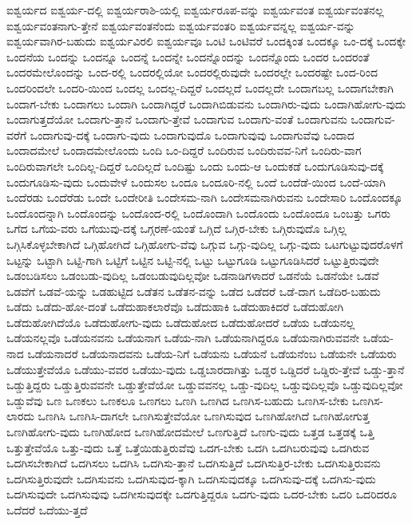 {ಐಶ್ವರ್ಯದ
ಐಶ್ವರ್ಯ-ದಲ್ಲಿ
ಐಶ್ವರ್ಯರಾಶಿ-ಯಲ್ಲಿ
ಐಶ್ವರ್ಯರೂಪ-ವನ್ನು
ಐಶ್ವರ್ಯವಂತ
ಐಶ್ವರ್ಯವಂತನಲ್ಲ
ಐಶ್ವರ್ಯವಂತನಾಗು-ತ್ತೇನೆ
ಐಶ್ವರ್ಯವಂತನೆಂದು
ಐಶ್ವರ್ಯವಂತರಿ
ಐಶ್ವರ್ಯವನ್ನಲ್ಲ
ಐಶ್ವರ್ಯ-ವನ್ನು
ಐಶ್ವರ್ಯವಾಗಿರ-ಬಹುದು
ಐಶ್ವರ್ಯವಿರಲಿ
ಐಶ್ವರ್ಯವೂ
ಒಂಟಿ
ಒಂಟಿವರೆ
ಒಂದಕ್ಕಿಂತ
ಒಂದಕ್ಕೂ
ಒಂ-ದಕ್ಕೆ
ಒಂದಕ್ಕೇ
ಒಂದನೆಯ
ಒಂದನ್ನು
ಒಂದನ್ನೂ
ಒಂದನ್ನೆ
ಒಂದನ್ನೇ
ಒಂದನ್ನೊಂದನ್ನು
ಒಂದನ್ನೊಂದು
ಒಂದರ
ಒಂದರಂತೆ
ಒಂದರಮೇಲೊಂದನ್ನು
ಒಂದ-ರಲ್ಲಿ
ಒಂದರಲ್ಲಿಯೋ
ಒಂದರಲ್ಲಿರುವುದೇ
ಒಂದರಲ್ಲೇ
ಒಂದರಷ್ಟೇ
ಒಂದ-ರಿಂದ
ಒಂದರಿಂದಲೇ
ಒಂದರಿ-ಯಿಂದ
ಒಂದಲ್ಲ
ಒಂದಲ್ಲ-ದಿದ್ದರೆ
ಒಂದಲ್ಲದೆ
ಒಂದಲ್ಲದೇ
ಒಂದಾಗಬಲ್ಲ
ಒಂದಾಗಬೇಕಾಗಿ
ಒಂದಾಗ-ಬೇಕು
ಒಂದಾಗಲು
ಒಂದಾಗಿ
ಒಂದಾಗಿದ್ದರೆ
ಒಂದಾಗಿಬಿಡುವನು
ಒಂದಾಗಿರು-ವುದು
ಒಂದಾಗಿಹೋಗು-ವುದು
ಒಂದಾಗುತ್ತದೆಯೋ
ಒಂದಾಗು-ತ್ತಾನೆ
ಒಂದಾಗು-ತ್ತೇವೆ
ಒಂದಾಗುವ
ಒಂದಾಗು-ವಂತೆ
ಒಂದಾಗುವನು
ಒಂದಾಗುವ-ವರೆಗೆ
ಒಂದಾಗುವು-ದಕ್ಕೆ
ಒಂದಾಗು-ವುದು
ಒಂದಾಗುವುದೊ
ಒಂದಾಗುವುವು
ಒಂದಾಗುವೆವು
ಒಂದಾದ
ಒಂದಾದಮೇಲೆ
ಒಂದಾದಮೇಲೊಂದು
ಒಂದಿ
ಒಂ-ದಿದ್ದರೆ
ಒಂದಿರುವ
ಒಂದಿರುವವ-ನಿಗೆ
ಒಂದಿರು-ವಾಗ
ಒಂದಿರುವಾಗಲೇ
ಒಂದಿಲ್ಲ-ದಿದ್ದರೆ
ಒಂದಿಲ್ಲದೆ
ಒಂದಿಷ್ಟು
ಒಂದು
ಒಂದು-ಆ
ಒಂದುಕಡೆ
ಒಂದುಗೂಡಿಸುವು-ದಕ್ಕೆ
ಒಂದುಗೂಡಿಸು-ವುದು
ಒಂದುವೇಳೆ
ಒಂದುಸಲ
ಒಂದೂ
ಒಂದೂರಿ-ನಲ್ಲಿ
ಒಂದೆ
ಒಂದೆಡೆ-ಯಿಂದ
ಒಂದೆ-ಯಾಗಿ
ಒಂದೆರಡು
ಒಂದೆರೆಡು
ಒಂದೇ
ಒಂದೇರೀತಿ
ಒಂದೇಸಮ-ನಾಗಿ
ಒಂದೇಸಮನಾಗಿರುವನು
ಒಂದೇಸಾರಿ
ಒಂದೊಂದಕ್ಕೂ
ಒಂದೊಂದನ್ನಾಗಿ
ಒಂದೊಂದನ್ನು
ಒಂದೊಂದ-ರಲ್ಲಿ
ಒಂದೊಂದಾಗಿ
ಒಂದೊಂದು
ಒಂದೊಂದೂ
ಒಂಬತ್ತು
ಒಗರು
ಒಗೆದ
ಒಗೆಯ-ವರು
ಒಗೆಯುವು-ದಕ್ಕೆ
ಒಗ್ಗರಣೆ-ಯಂತೆ
ಒಗ್ಗಿದೆ
ಒಗ್ಗಿರ-ಬೇಕು
ಒಗ್ಗಿರುವುದೊ
ಒಗ್ಗಿಲ್ಲ
ಒಗ್ಗಿಸಿಕೊಳ್ಳಬೇಕಾಗಿದೆ
ಒಗ್ಗಿಹೋಗಿದೆ
ಒಗ್ಗಿಹೋಗು-ವೆವು
ಒಗ್ಗುವ
ಒಗ್ಗು-ವುದಿಲ್ಲ
ಒಗ್ಗು-ವುದು
ಒಟಗುಟ್ಟುವುದರೊಳಗೆ
ಒಟ್ಟನ್ನು
ಒಟ್ಟಾಗಿ
ಒಟ್ಟಿ-ಗಾಗಿ
ಒಟ್ಟಿಗೆ
ಒಟ್ಟಿನ
ಒಟ್ಟಿ-ನಲ್ಲಿ
ಒಟ್ಟು
ಒಟ್ಟುಗೂಡಿ
ಒಟ್ಟುಗೂಡಿಸಿದರೆ
ಒಟ್ಟುತ್ತಿರುವುದೇ
ಒಡಂಬಡಿಸಲು
ಒಡಂಬಡು-ವುದಿಲ್ಲ
ಒಡಂಬಡುವುದಿಲ್ಲವೋ
ಒಡನಾಡಿಗಳಾದರೆ
ಒಡನೆಯೆ
ಒಡನೆಯೇ
ಒಡವೆ
ಒಡವೆಗೆ
ಒಡವೆ-ಯನ್ನು
ಒಡಹುಟ್ಟಿದ
ಒಡೆತನ
ಒಡೆತನ-ವನ್ನು
ಒಡೆದ
ಒಡೆದರೆ
ಒಡೆ-ದಾಗ
ಒಡೆದಿರ-ಬಹುದು
ಒಡೆದು
ಒಡೆದು-ಹೋ-ದಂತೆ
ಒಡೆದುಹಾಕಲಾರೆವೊ
ಒಡೆದುಹಾಕಿ
ಒಡೆದುಹಾಕಿದರೆ
ಒಡೆದುಹೋಗಿ
ಒಡೆದುಹೋಗಿದೆಯೊ
ಒಡೆದುಹೋಗು-ವುದು
ಒಡೆದುಹೋದ
ಒಡೆದುಹೋದರೆ
ಒಡೆಯ
ಒಡೆಯನಲ್ಲ
ಒಡೆಯನಲ್ಲವೊ
ಒಡೆಯನವನು
ಒಡೆಯನಾಗ
ಒಡೆಯ-ನಾಗಿ
ಒಡೆಯನಾಗಿದ್ದರೂ
ಒಡೆಯನಾಗಿರುವವನೇ
ಒಡೆಯ-ನಾದ
ಒಡೆಯನಾದರೆ
ಒಡೆಯನಾದವನು
ಒಡೆಯ-ನಿಗೆ
ಒಡೆಯನು
ಒಡೆಯನೆ
ಒಡೆಯನೆಂಬ
ಒಡೆಯನೇ
ಒಡೆಯರು
ಒಡೆಯುತ್ತೇವೆಯೊ
ಒಡೆಯು-ವವರ
ಒಡೆಯು-ವುದು
ಒಡ್ಡಬಾರದಾಗಿತ್ತು
ಒಡ್ಡರ
ಒಡ್ಡಿದರೆ
ಒಡ್ಡಿರು-ತ್ತೇವೆ
ಒಡ್ಡು-ತ್ತಾನೆ
ಒಡ್ಡುತ್ತಿದ್ದರು
ಒಡ್ಡುತ್ತಿರುವವನೇ
ಒಡ್ಡುತ್ತೇವೆಯೋ
ಒಡ್ಡುವವನಲ್ಲ
ಒಡ್ಡು-ವುದಿಲ್ಲ
ಒಡ್ಡುವುದಿಲ್ಲವೊ
ಒಡ್ಡುವುದಿಲ್ಲವೋ
ಒಡ್ಡುವೆವು
ಒಣ
ಒಣಕಲು
ಒಣಕಲೂ
ಒಣಗಲು
ಒಣಗಿ
ಒಣಗಿದ
ಒಣಗಿಸ-ಬಹುದು
ಒಣಗಿಸ-ಬೇಕು
ಒಣಗಿಸ-ಲಾರದು
ಒಣಗಿಸಿ
ಒಣಗಿಸಿ-ದಾಗಲೇ
ಒಣಗಿಸುತ್ತೇವೆಯೋ
ಒಣಗಿಸುವುದ
ಒಣಗಿಹೋಗಿದೆ
ಒಣಗಿಹೋಗುತ್ತ
ಒಣಗಿಹೋಗು-ವುದು
ಒಣಗಿಹೋದ
ಒಣಗಿಹೋದಮೇಲೆ
ಒಣಗುತ್ತಿದೆ
ಒಣಗು-ವುದು
ಒತ್ತಡ
ಒತ್ತಡಕ್ಕೆ
ಒತ್ತಿ
ಒತ್ತುತ್ತೇವೆಯೊ
ಒತ್ತು-ವುದು
ಒತ್ತೆ
ಒತ್ತೆಯಿಡುತ್ತಿರುವೆವು
ಒದಗ-ಬೇಕು
ಒದಗಿ
ಒದಗಿಬರುವುವು
ಒದಗಿರುವ
ಒದಗಿಸಬೇಕಾಗಿದೆ
ಒದಗಿಸಲು
ಒದಗಿಸಿ
ಒದಗಿಸು-ತ್ತಾನೆ
ಒದಗಿಸುತ್ತಿದೆ
ಒದಗಿಸುತ್ತಿರ-ಬೇಕು
ಒದಗಿಸುತ್ತಿರುವನು
ಒದಗಿಸುತ್ತಿರುವುದೇ
ಒದಗಿಸುವನು
ಒದಗಿಸುವುದ-ಕ್ಕಾಗಿ
ಒದಗಿಸುವುದಕ್ಕೂ
ಒದಗಿಸುವು-ದಕ್ಕೆ
ಒದಗಿಸು-ವುದು
ಒದಗಿಸುವುದೇ
ಒದಗಿಸುವುವು
ಒದಗೀಸುವುದಕ್ಕೇ
ಒದಗುತ್ತಿದ್ದರೂ
ಒದಗು-ವುದು
ಒದರ-ಬೇಕು
ಒದರಿ
ಒದರಿದರೂ
ಒದೆದರೆ
ಒದೆಯು-ತ್ತದೆ
}
